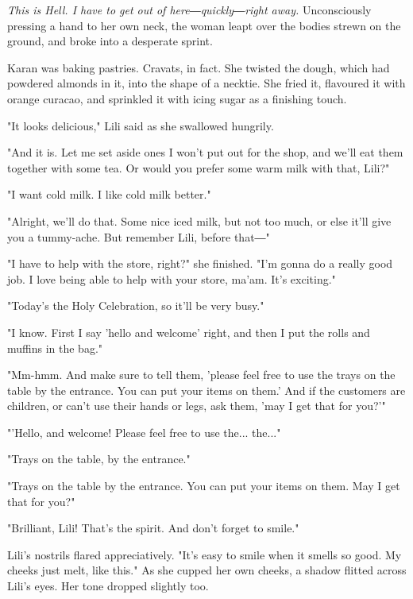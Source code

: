 \emph{This is Hell. I have to get out of here―quickly―right away.}
Unconsciously pressing a hand to her own neck, the woman leapt over the
bodies strewn on the ground, and broke into a desperate sprint.


Karan was baking pastries. Cravats, in fact. She twisted the dough,
which had powdered almonds in it, into the shape of a necktie. She fried
it, flavoured it with orange curacao, and sprinkled it with icing sugar
as a finishing touch.

"It looks delicious," Lili said as she swallowed hungrily.

"And it is. Let me set aside ones I won't put out for the shop, and
we'll eat them together with some tea. Or would you prefer some warm
milk with that, Lili?"

"I want cold milk. I like cold milk better."

"Alright, we'll do that. Some nice iced milk, but not too much, or else
it'll give you a tummy-ache. But remember Lili, before that―"

"I have to help with the store, right?" she finished. "I'm gonna do a
really good job. I love being able to help with your store, ma'am. It's
exciting."

"Today's the Holy Celebration, so it'll be very busy."

"I know. First I say 'hello and welcome' right, and then I put the rolls
and muffins in the bag."

"Mm-hmm. And make sure to tell them, 'please feel free to use the trays
on the table by the entrance. You can put your items on them.' And if
the customers are children, or can't use their hands or legs, ask them,
'may I get that for you?'"

"'Hello, and welcome! Please feel free to use the... the..."

"Trays on the table, by the entrance."

"Trays on the table by the entrance. You can put your items on them. May
I get that for you?"

"Brilliant, Lili! That's the spirit. And don't forget to smile."

Lili's nostrils flared appreciatively. "It's easy to smile when it
smells so good. My cheeks just melt, like this." As she cupped her own
cheeks, a shadow flitted across Lili's eyes. Her tone dropped slightly
too.

